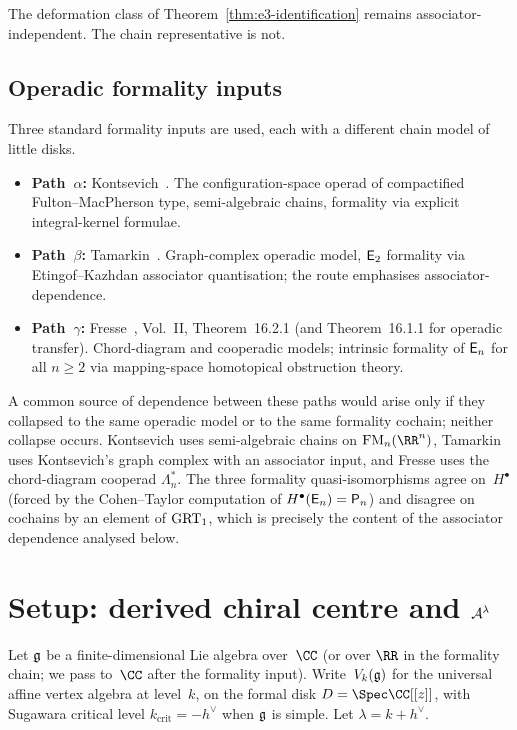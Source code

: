 The deformation class of Theorem~\ref{thm:e3-identification}
remains associator-independent. The chain representative is not.

\subsection*{Operadic formality inputs}
\label{sec:e3-identification-chain-level-hz4}

Three standard formality inputs are used, each with a different
chain model of little disks.

\begin{itemize}
\item \textbf{Path~$\alpha$:} Kontsevich~\cite{Kon99}. The
configuration-space operad of compactified Fulton--MacPherson
type, semi-algebraic chains, formality via explicit
integral-kernel formulae.

\item \textbf{Path~$\beta$:} Tamarkin~\cite{Tamarkin03}.
Graph-complex operadic model, $\mathsf{E}_2$ formality via
Etingof--Kazhdan associator quantisation; the route emphasises
associator-dependence.

\item \textbf{Path~$\gamma$:} Fresse~\cite{Fresse17},
Vol.~II, Theorem~16.2.1 (and Theorem~16.1.1 for operadic
transfer). Chord-diagram and cooperadic models; intrinsic
formality of $\mathsf{E}_n$ for all $n \geq 2$ via mapping-space
homotopical obstruction theory.
\end{itemize}

A common source of dependence between these paths would
arise only if they collapsed to the same operadic model or to
the same formality cochain; neither collapse occurs.
Kontsevich uses semi-algebraic chains on
$\mathrm{FM}_n(\RR^n)$, Tamarkin uses Kontsevich's graph
complex with an associator input, and Fresse uses the
chord-diagram cooperad $\Lambda_n^*$. The three formality
quasi-isomorphisms agree on~$H^\bullet$ (forced by the
Cohen--Taylor computation of $H^\bullet(\mathsf{E}_n) = \mathsf{P}_n$) and
disagree on cochains by an element of $\mathrm{GRT}_1$, which is
precisely the content of the associator dependence analysed
below.

\section{Setup: derived chiral centre and \texorpdfstring{$\mathcal{A}^\lambda$}{A lambda}}
\label{sec:e3-identification-setup}

Let $\mathfrak{g}$ be a finite-dimensional Lie algebra over~$\CC$ (or
over $\RR$ in the formality chain; we pass to~$\CC$ after the
formality input). Write~$V_k(\mathfrak{g})$ for the universal affine
vertex algebra at level~$k$, on the formal disk
$D = \Spec\CC[[z]]$, with Sugawara critical level
$k_{\mathrm{crit}} = -h^\vee$ when $\mathfrak{g}$ is simple. Let
$\lambda = k + h^\vee$.

